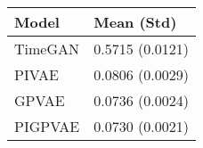 \begin{tabular}{ll}
\toprule
Model & Mean (Std) \\
\midrule
TimeGAN & 0.5715 (0.0121) \\
PIVAE & 0.0806 (0.0029) \\
GPVAE & 0.0736 (0.0024) \\
PIGPVAE & 0.0730 (0.0021) \\
\bottomrule
\end{tabular}
